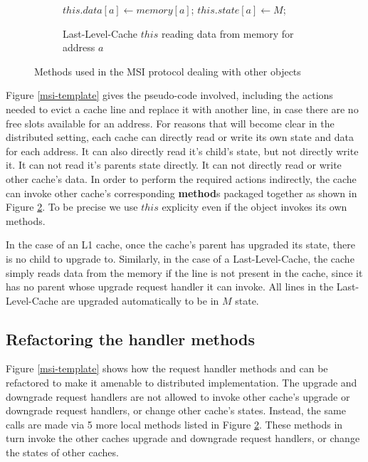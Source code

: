 \begin{figure}
\begin{subfigure}{\linewidth}
\begin{boxedminipage}{\linewidth}
\begin{algorithmic}
  \State $this.data[a] \gets memory[a]$;
  \State $this.state[a] \gets M$;
\EndProc
\end{algorithmic}
\end{boxedminipage}
\caption{Last-Level-Cache $this$ reading data from memory for address $a$}
\label{uResp}
\end{subfigure}

\caption{Methods used in the MSI protocol dealing with other objects}
\label{atomic}
\end{figure}

Figure \ref{msi-template} gives the pseudo-code involved, including the
actions needed to evict a cache line and replace it with another line, in case
there are no free slots available for an address. For reasons that will become
clear in the distributed setting, each cache can directly read or write its own
state and data for each address. It can also directly read it's child's state,
but not directly write it. It can not read it's parents state directly. It can
not directly read or write other cache's data. In order to perform the required
actions indirectly, the cache can invoke other cache's corresponding
\textbf{method}s packaged together as shown in Figure \ref{atomic}. To be
precise we use $this$ explicity even if the object invokes its own methods.

In the case of an L1 cache, once the cache's parent has upgraded its state,
there is no child to upgrade to. Similarly, in the case of a Last-Level-Cache,
the cache simply reads data from the memory if the line is not present in the
cache, since it has no parent whose upgrade request handler it can invoke. All
lines in the Last-Level-Cache are upgraded automatically to be in $M$ state.

\subsection{Refactoring the handler methods}
Figure \ref{msi-template} shows how the request handler methods \uReq{} and
\dReq{} can be refactored to make it amenable to distributed implementation. The
upgrade and downgrade request handlers are not allowed to invoke other cache's
upgrade or downgrade request handlers, or change other cache's states. Instead,
the same calls are made via 5 more local methods listed in Figure \ref{atomic}.
These methods in turn invoke the other caches upgrade and downgrade request
handlers, or change the states of other caches.

